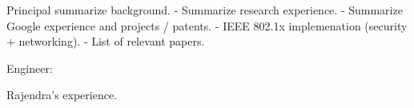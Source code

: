 
Principal 
summarize background.
- Summarize research experience.
- Summarize Google experience and projects / patents.
- IEEE 802.1x implemenation (security + networking).
- List of relevant papers.

Engineer:

Rajendra's experience.
